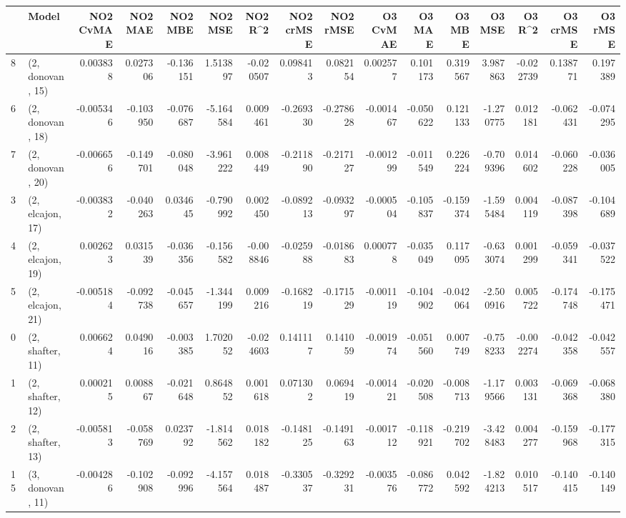 \begin{tabular}{llrrrrrrrrrrrrrr}
\toprule
{} &             Model &  NO2 CvMAE &   NO2 MAE &   NO2 MBE &    NO2 MSE &   NO2 R\textasciicircum2 &  NO2 crMSE &  NO2 rMSE &  O3 CvMAE &    O3 MAE &    O3 MBE &     O3 MSE &    O3 R\textasciicircum2 &  O3 crMSE &   O3 rMSE \\
\midrule
8  &  (2, donovan, 15) &   0.003838 &  0.027306 & -0.136151 &   1.513897 & -0.020507 &   0.098413 &  0.082154 &  0.002577 &  0.101173 &  0.319567 &   3.987863 & -0.022739 &  0.138771 &  0.197389 \\
6  &  (2, donovan, 18) &  -0.005346 & -0.103950 & -0.076687 &  -5.164584 &  0.009461 &  -0.269330 & -0.278628 & -0.001467 & -0.050622 &  0.121133 &  -1.270775 &  0.012181 & -0.062431 & -0.074295 \\
7  &  (2, donovan, 20) &  -0.006656 & -0.149701 & -0.080048 &  -3.961222 &  0.008449 &  -0.211890 & -0.217127 & -0.001299 & -0.011549 &  0.226224 &  -0.709396 &  0.014602 & -0.060228 & -0.036005 \\
3  &  (2, elcajon, 17) &  -0.003832 & -0.040263 &  0.034645 &  -0.790992 &  0.002450 &  -0.089213 & -0.093297 & -0.000504 & -0.105837 & -0.159374 &  -1.595484 &  0.004119 & -0.087398 & -0.104689 \\
4  &  (2, elcajon, 19) &   0.002623 &  0.031539 & -0.036356 &  -0.156582 & -0.008846 &  -0.025988 & -0.018683 &  0.000778 & -0.035049 &  0.117095 &  -0.633074 &  0.001299 & -0.059341 & -0.037522 \\
5  &  (2, elcajon, 21) &  -0.005184 & -0.092738 & -0.045657 &  -1.344199 &  0.009216 &  -0.168219 & -0.171529 & -0.001119 & -0.104902 & -0.042064 &  -2.500916 &  0.005722 & -0.174748 & -0.175471 \\
0  &  (2, shafter, 11) &   0.006624 &  0.049016 & -0.003385 &   1.702052 & -0.024603 &   0.141117 &  0.141059 & -0.001974 & -0.051560 &  0.007749 &  -0.758233 & -0.002274 & -0.042358 & -0.042557 \\
1  &  (2, shafter, 12) &   0.000215 &  0.008867 & -0.021648 &   0.864852 &  0.001618 &   0.071302 &  0.069419 & -0.001421 & -0.020508 & -0.008713 &  -1.179566 &  0.003131 & -0.069368 & -0.068380 \\
2  &  (2, shafter, 13) &  -0.005813 & -0.058769 &  0.023792 &  -1.814562 &  0.018182 &  -0.148125 & -0.149163 & -0.001712 & -0.118921 & -0.219702 &  -3.428483 &  0.004277 & -0.159968 & -0.177315 \\
15 &  (3, donovan, 11) &  -0.004286 & -0.102908 & -0.092996 &  -4.157564 &  0.018487 &  -0.330537 & -0.329231 & -0.003576 & -0.086772 &  0.042592 &  -1.824213 &  0.010517 & -0.140415 & -0.140149 \\

\end{tabular}
